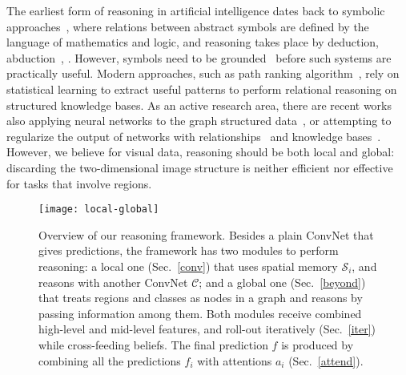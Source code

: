 \documentclass[10pt,twocolumn,letterpaper]{article}
\begin{document}
 The earliest form of reasoning in artificial intelligence dates back to symbolic approaches~\cite{newell1980physical}, where relations between abstract symbols are defined by the language of mathematics and logic, and reasoning takes place by deduction, abduction~\cite{hobbs1988interpretation}, \etc. However, symbols need to be grounded~\cite{harnad1990symbol} before such systems are practically useful. Modern approaches, such as path ranking algorithm~\cite{lao2011random}, rely on statistical learning to extract useful patterns to perform relational reasoning on structured knowledge bases. As an active research area, there are recent works also applying neural networks to the graph structured data~\cite{scarselli2009graph,henaff2015deep,li2015gated,kipf2016semi,niepert2016learning,das2016chains,marino2016more}, or attempting to regularize the output of networks with relationships~\cite{deng2014large} and knowledge bases~\cite{hu2016deep}. However, we believe for visual data, reasoning should be both local and global: discarding the two-dimensional image structure is neither efficient nor effective for tasks that involve regions.

\begin{figure*}[t]
\centering
\texttt{[image: local-global]}
\caption{{\small Overview of our reasoning framework. Besides a plain ConvNet that gives predictions, the framework has two modules to perform reasoning: a local one (Sec.~\ref{conv}) that uses spatial memory $\mathcal{S}_i$, and reasons with another ConvNet $\mathcal{C}$; and a global one (Sec.~\ref{beyond}) that treats regions and classes as nodes in a graph and reasons by passing information among them. Both modules receive combined high-level and mid-level features, and roll-out iteratively (Sec.~\ref{iter}) while cross-feeding beliefs. The final prediction $f$ is produced by combining all the predictions $f_i$ with attentions $a_i$ (Sec.~\ref{attend}).}\label{fig:overview}}
\vspace{-0.2in}
\end{figure*}

\vspace{-0.05in}
\end{document}
